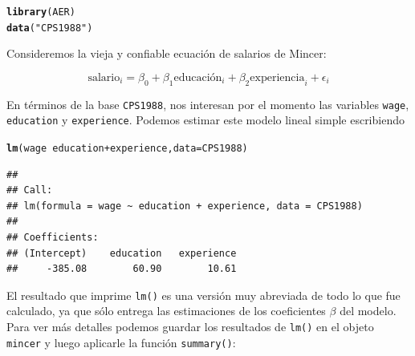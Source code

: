 \documentclass{article}\usepackage[]{graphicx}\usepackage[]{color}
\makeatletter
\newcommand{\hlstr}[1]{\textcolor[rgb]{0.192,0.494,0.8}{#1}}%
\newcommand{\hlopt}[1]{\textcolor[rgb]{0,0,0}{#1}}%
\newcommand{\hlstd}[1]{\textcolor[rgb]{0.345,0.345,0.345}{#1}}%
\newcommand{\hlkwc}[1]{\textcolor[rgb]{0.333,0.667,0.333}{#1}}%
\newcommand{\hlkwd}[1]{\textcolor[rgb]{0.737,0.353,0.396}{\textbf{#1}}}%
\newenvironment{kframe}{%
 \def\at@end@of@kframe{}%
 \ifinner\ifhmode%
  \def\at@end@of@kframe{\end{minipage}}%
  \begin{minipage}{\columnwidth}%
 \fi\fi%
 \def\FrameCommand##1{\hskip\@totalleftmargin \hskip-\fboxsep
 \colorbox{shadecolor}{##1}\hskip-\fboxsep
     \hskip-\linewidth \hskip-\@totalleftmargin \hskip\columnwidth}%
 \MakeFramed {\advance\hsize-\width
   \@totalleftmargin\z@ \linewidth\hsize
   \@setminipage}}%
 {\par\unskip\endMakeFramed%
 \at@end@of@kframe}
\newenvironment{knitrout}{}{} %
\newcommand*{\paq}[1]{\textbf{#1}}
\makeatother
\begin{document}
\hrulefill

\begin{knitrout}
\color{fgcolor}\begin{kframe}
\begin{alltt}
\hlkwd{library}\hlstd{(AER)}
\hlkwd{data}\hlstd{(}\hlstr{"CPS1988"}\hlstd{)}
\end{alltt}
\end{kframe}
\end{knitrout}

Consideremos la vieja y confiable ecuación de salarios de Mincer:

\begin{equation}
\text{salario}_i = \beta_0 + \beta_1 \text{educación}_i + \beta_2 \text{experiencia}_i + \epsilon_i
\label{eq:mincer}
\end{equation}

En términos de la base \verb|CPS1988|, nos interesan por el momento las variables \verb|wage|, \verb|education| y \verb|experience|. Podemos estimar este modelo lineal simple escribiendo

\begin{knitrout}
\color{fgcolor}\begin{kframe}
\begin{alltt}
\hlkwd{lm}\hlstd{(wage} \hlopt{~} \hlstd{education} \hlopt{+} \hlstd{experience,} \hlkwc{data} \hlstd{= CPS1988)}
\end{alltt}
\begin{verbatim}
## 
## Call:
## lm(formula = wage ~ education + experience, data = CPS1988)
## 
## Coefficients:
## (Intercept)    education   experience  
##     -385.08        60.90        10.61
\end{verbatim}
\end{kframe}
\end{knitrout}

El resultado que imprime \verb|lm()| es una versión muy abreviada de todo lo que fue calculado, ya que sólo entrega las estimaciones de los coeficientes $\beta$ del modelo. Para ver más detalles podemos guardar los resultados de \verb|lm()| en el objeto \verb|mincer| y luego aplicarle la función \verb|summary()|:
\end{document}
